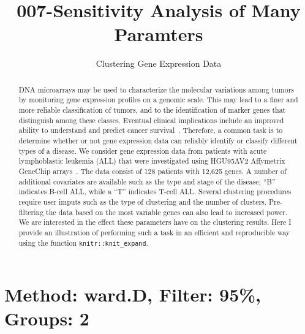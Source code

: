 \documentclass[11pt,letter]{article}\usepackage[]{graphicx}\usepackage[]{color}
\begin{document}
\pagestyle{fancy}

\title{007-Sensitivity Analysis of Many Paramters}
\author{Clustering Gene Expression Data}
\maketitle







\begin{abstract}
DNA microarrays may be used to characterize the molecular variations among tumors by monitoring gene expression profiles on a genomic scale. This may lead to a finer and more reliable classification of tumors, and to the identification of marker genes that distinguish among these classes. Eventual clinical implications include an improved ability to understand and predict cancer survival~\citep{cluster}. Therefore, a common task is to determine whether or not gene expression data can reliably identify or classify different types of a disease. We consider gene expression data from patients with acute lymphoblastic leukemia (ALL) that were investigated using HGU95AV2 Affymetrix GeneChip arrays~\citep{chiaretti2004gene}. The data consist of 128 patients with 12,625 genes. A number of additional covariates are available such as the type and stage of the disease; ``B'' indicates B-cell ALL, while a ``T'' indicates T-cell ALL. Several clustering procedures require user imputs such as the type of clustering and the number of clusters. Pre-filtering the data based on the most variable genes can also lead to increased power. We are interested in the effect these parameters have on the clustering results. Here I provide an illustration of performing such a task in an efficient and reproducible way using the function \texttt{knitr::knit\_expand}.
\end{abstract}


\tableofcontents





\newpage
\section{Method: ward.D, Filter: 95\%, Groups: 2}
\end{document}
